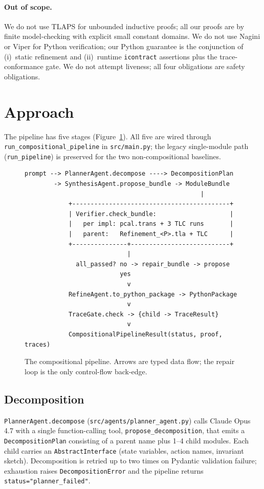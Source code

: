 \documentclass[11pt]{article}
\begin{document}
\paragraph{Out of scope.} We do not use TLAPS for unbounded inductive proofs;
all our proofs are by finite model-checking with explicit small constant
domains. We do not use Nagini or Viper for Python verification; our Python
guarantee is the conjunction of (i)~static refinement and (ii)~runtime
\texttt{icontract} assertions plus the trace-conformance gate. We do not
attempt liveness; all four obligations are safety obligations.

\section{Approach}\label{sec:approach}

The pipeline has five stages (Figure~\ref{fig:pipeline}). All five are
wired through \texttt{run\_compositional\_pipeline} in
\texttt{src/main.py}; the legacy single-module path
(\texttt{run\_pipeline}) is preserved for the two non-compositional
baselines.

\begin{figure}[t]
\begin{lstlisting}
prompt --> PlannerAgent.decompose ----> DecompositionPlan
        -> SynthesisAgent.propose_bundle -> ModuleBundle
                                                |
            +-------------------------------------------+
            | Verifier.check_bundle:                    |
            |   per impl: pcal.trans + 3 TLC runs       |
            |   parent:   Refinement_<P>.tla + TLC      |
            +---------------+---------------------------+
                            |
              all_passed? no -> repair_bundle -> propose
                          yes
                            v
            RefineAgent.to_python_package -> PythonPackage
                            v
            TraceGate.check -> {child -> TraceResult}
                            v
            CompositionalPipelineResult(status, proof, traces)
\end{lstlisting}
\caption{The compositional pipeline. Arrows are typed data flow; the repair
loop is the only control-flow back-edge.}
\label{fig:pipeline}
\end{figure}

\subsection{Decomposition}
\texttt{PlannerAgent.decompose} (\texttt{src/agents/planner\_agent.py}) calls
Claude Opus 4.7 with a single function-calling tool,
\texttt{propose\_decomposition}, that emits a \texttt{DecompositionPlan}
consisting of a parent name plus 1--4 child modules. Each child carries an
\texttt{AbstractInterface} (state variables, action names, invariant sketch).
Decomposition is retried up to two times on Pydantic validation failure;
exhaustion raises \texttt{DecompositionError} and the pipeline returns
\texttt{status="planner\_failed"}.
\end{document}
